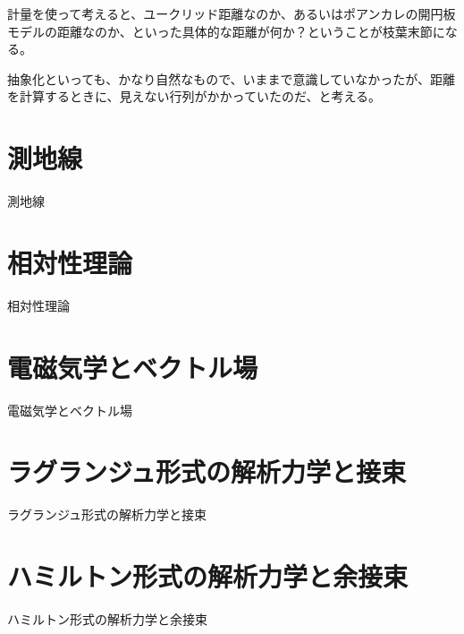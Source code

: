 計量を使って考えると、ユークリッド距離なのか、あるいはポアンカレの開円板モデルの距離なのか、といった具体的な距離が何か？ということが枝葉末節になる。

抽象化といっても、かなり自然なもので、いままで意識していなかったが、距離を計算するときに、見えない行列がかかっていたのだ、と考える。

\newpage


\section{ 測地線 }

測地線

\newpage


\section{ 相対性理論 }

相対性理論

\newpage


\section{ 電磁気学とベクトル場 }

電磁気学とベクトル場

\newpage


\section{ ラグランジュ形式の解析力学と接束 }

ラグランジュ形式の解析力学と接束

\newpage


\section{ ハミルトン形式の解析力学と余接束 }

ハミルトン形式の解析力学と余接束

\newpage
